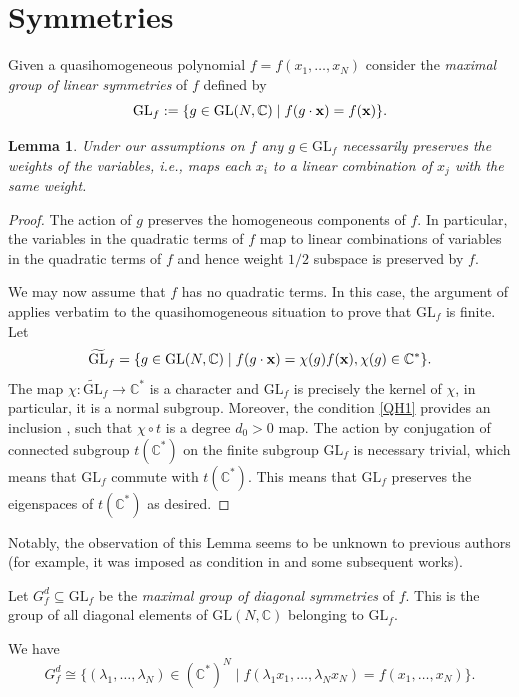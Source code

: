 \documentclass[pdftex]{sigma}
\numberwithin{equation}{section}
\newtheorem{Lemma}[Theorem]{Lemma}
\newcommand{\CC}{{\mathbb{C}}}
\newcommand{\GL}{{\mathrm{GL}}}
\newcommand{\bx}{{\bf x}}
\newcommand\wt{\widetilde}
\begin{document}
\section{Symmetries}\label{section: symmetries}
Given a quasihomogeneous polynomial $f = f(x_1,\dots,x_N)$ consider the
\textit{maximal group of linear symmetries} of $f$ defined by
\[
	\GL_f :=  \lbrace g \in \GL(N,\CC) \mid f(g \cdot \bx) = f(\bx) \rbrace.
\]

\begin{Lemma}
 Under our assumptions on $f$ any $g \in \GL_f$ necessarily preserves the weights of the variables, i.e., maps each $x_i$ to a linear combination of $x_j$ with the same weight.
\end{Lemma}
\begin{proof}
The action of $g$ preserves the homogeneous components of $f$. In particular, the variables in the quadratic terms of $f$ map to linear combinations of variables in the quadratic terms of $f$ and hence weight $1/2$ subspace is preserved by $f$.

We may now assume that $f$ has no quadratic terms. In this case, the argument of \cite[Theorem 2.1]{OS78} applies verbatim to the quasihomogeneous situation to prove that $\GL_f$ is finite. Let \[\wt{\GL}_f= \lbrace g \in \GL(N,\CC) \mid f(g \cdot \bx) = \chi(g)f(\bx), \chi(g)\in\CC^*  \rbrace.\]
The map $\chi\colon\wt{\GL}_f\to\CC^*$ is a character and $\GL_f$ is precisely the kernel of $\chi$, in particular, it is a normal subgroup. Moreover, the condition \eqref{QH1} provides an inclusion \smash{$t\colon\CC^*\hookrightarrow\wt{\GL}_f$}, such that $\chi\circ t$ is a degree $d_0>0$ map. The action by conjugation of connected subgroup $t(\CC^*)$ on the finite subgroup $\GL_f$ is necessary trivial, which means that $\GL_f$ commute with $t(\CC^*)$. This means that $\GL_f$ preserves the eigenspaces of $t(\CC^*)$ as desired.
\end{proof}

\begin{Remark}
 Notably, the observation of this Lemma seems to be unknown to previous authors (for example, it was imposed as condition in \cite{Muk} and some subsequent works).
\end{Remark}

Let $G_f^d \subseteq \GL_f$ be the \textit{maximal group of diagonal symmetries} of $f$. This is the group of all diagonal elements of $\GL(N,\CC)$ belonging to $\GL_f$.

We have
\[
	G_f^d \cong \bigl\lbrace (\lambda_1,\dots,\lambda_N) \in (\CC^*)^N \mid f(\lambda_1x_1,\dots,\lambda_Nx_N) = f(x_1,\dots,x_N) \bigr\rbrace.
\]
\end{document}
